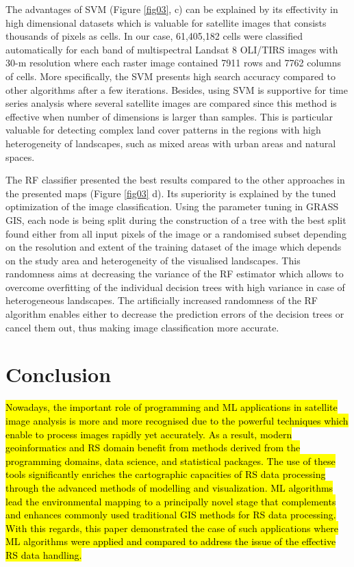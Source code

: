\documentclass[final,5p,times,twocolumn]{elsarticle}
\begin{document}
The advantages of SVM (Figure \ref{fig03}, c) can be explained by its effectivity in high dimensional datasets which is valuable for satellite images that consists thousands of pixels as cells. In our case, 61,405,182 cells were classified automatically for each band of multispectral Landsat 8\hl{ }OLI/TIRS images with 30-m resolution where each raster image contained 7911 rows and 7762 columns of cells. More specifically, the SVM presents high search accuracy compared to other algorithms after a few iterations. Besides, using SVM is supportive for time series analysis where several satellite images are compared since this method is effective when number of dimensions is larger than samples. This is particular valuable for detecting complex land cover patterns in the regions with high heterogeneity of landscapes, such as mixed areas with urban areas and natural spaces. 

The RF classifier presented the best results compared to the other approaches in the presented maps (Figure \ref{fig03} d). Its superiority is explained by the tuned optimization of the image classification. Using the parameter tuning in GRASS GIS, each node is being split during the construction of a tree with the best split found either from all input pixels of the image or a randomised subset depending on the resolution and extent of the training dataset of the image which depends on the study area and heterogeneity of the visualised landscapes. This randomness aims at decreasing the variance of the RF estimator which allows to overcome overfitting of the individual decision trees with high variance in case of heterogeneous landscapes. The artificially increased randomness of the RF algorithm enables either to decrease the prediction errors of the decision trees or cancel them out, thus making image classification more accurate.

\section{Conclusion}

\hl{Nowadays, the important role of programming and ML applications in satellite image analysis is more and more recognised due to the powerful techniques which enable to process images rapidly yet accurately. As a result, modern geoinformatics and RS domain benefit from methods derived from the programming domains, data science, and statistical packages. The use of these tools significantly enriches the cartographic capacities of RS data processing through the advanced methods of modelling and visualization. ML algorithms lead the environmental mapping to a principally novel stage that complements and enhances commonly used traditional GIS methods for RS data processing. With this regards, this paper demonstrated the case of such applications where ML algorithms were applied and compared to address the issue of the effective RS data handling.}
\end{document}
